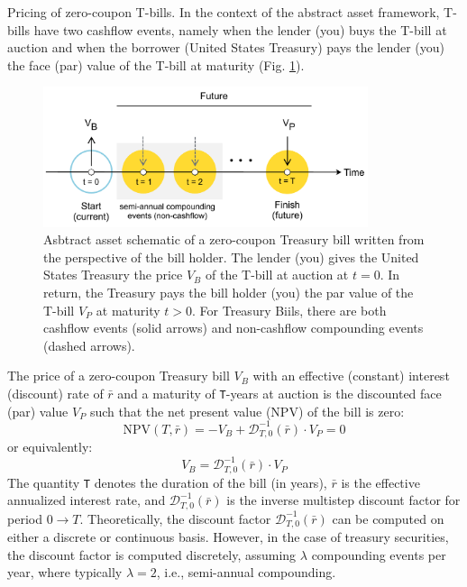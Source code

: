 \documentclass[11pt]{article}
\makeatletter
\theoremstyle{definition}
\renewcommand\subsubsection{\@startsection
	{subsubsection}{2}{0mm}
	{-0.05in}
	{-0.5\baselineskip}
	{\normalfont\normalsize\itshape\bfseries}}
\makeatother
\begin{document}
\subsubsection{Pricing of zero-coupon T-bills.}
In the context of the abstract asset framework, T-bills have two cashflow events, namely when the lender (you) buys the T-bill at auction 
and when the borrower (United States Treasury) pays the lender (you) the face (par) value of the T-bill at maturity (Fig. \ref{fig:t-bill-schematic}).
\begin{figure}[h]
    \centering
    \includegraphics[width=0.85\textwidth]{./figs/Fig-Bill-Asset-Timeline-Schematic.pdf}
    \caption{Asbtract asset schematic of a zero-coupon Treasury bill written from the perspective of the bill holder. The lender (you) gives the United States Treasury 
    the price $V_{B}$ of the T-bill at auction at $ t = 0$. In return, the Treasury pays the bill holder (you) the par value of the T-bill $V_{P}$ at maturity $t>0$. 
	For Treasury Biils, there are both cashflow events (solid arrows) and non-cashflow compounding events (dashed arrows).}\label{fig:t-bill-schematic}
\end{figure}
The price of a zero-coupon Treasury bill $V_{B}$ with an effective (constant) interest (discount) rate of $\bar{r}$ and a maturity of \texttt{T}-years at auction 
is the discounted face (par) value $V_{P}$ such that the net present value (NPV) of the bill is zero:
\begin{equation}    
\text{NPV}(T,\bar{r}) = -V_{B} + \mathcal{D}_{T,0}^{-1}(\bar{r})\cdot{V_{P}} = 0
\end{equation}
or equivalently:
\begin{equation}\label{eq:zero-coupon-treasury-bill-price}
    V_{B} = \mathcal{D}_{T,0}^{-1}(\bar{r})\cdot{V_{P}}
\end{equation}
The quantity \texttt{T} denotes the duration of the bill (in years), 
$\bar{r}$ is the effective annualized interest rate,  and $\mathcal{D}_{T,0}^{-1}(\bar{r})$ is the inverse multistep discount factor
for period $0\rightarrow{T}$. 
Theoretically, the discount factor $\mathcal{D}_{T,0}^{-1}(\bar{r})$ can be computed on either a discrete or continuous basis. 
However, in the case of treasury securities, the discount factor is computed discretely, assuming $\lambda$ compounding events per year, 
where typically $\lambda = 2$, i.e., semi-annual compounding.
\end{document}
